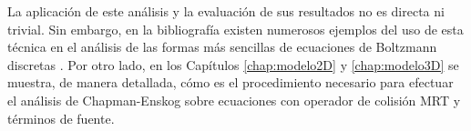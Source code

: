 La aplicaci\'on de este an\'alisis y la evaluaci\'on de sus resultados no es directa ni trivial. Sin embargo, en la bibliograf\'ia existen numerosos ejemplos del uso de esta t\'ecnica en el an\'alisis de las formas m\'as sencillas de ecuaciones de Boltzmann discretas \cite{kruger_lattice_2017, succi_lattice_2001, succi_lattice_2018, guo_lattice_2013}. Por otro lado, en los Cap\'itulos \ref{chap:modelo2D} y \ref{chap:modelo3D} se muestra, de manera detallada, c\'omo es el procedimiento necesario para efectuar el an\'alisis de Chapman-Enskog sobre ecuaciones con operador de colisi\'on MRT y t\'erminos de fuente.

%
